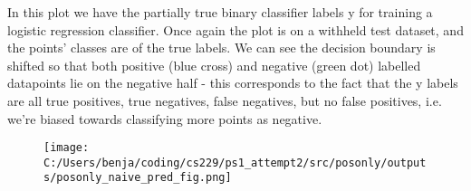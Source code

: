 %
%


\begin{answer}
In this plot we have the partially true binary classifier labels y for training a logistic regression classifier. Once again the plot is on a withheld test dataset, and the points' classes are of the true labels. We can see the decision boundary is shifted so that both positive (blue cross) and negative (green dot) labelled datapoints lie on the negative half - this corresponds to the fact that the y labels are all true positives, true negatives, false negatives, but no false positives, i.e. we're biased towards classifying more points as negative.
\begin{figure}[H]
	\texttt{[image: C:/Users/benja/coding/cs229/ps1\_attempt2/src/posonly/outputs/posonly\_naive\_pred\_fig.png]}
\end{figure}

\end{answer}
%